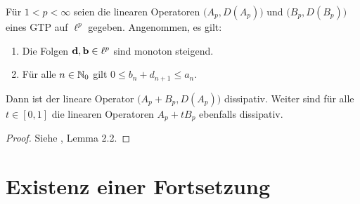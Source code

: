 \begin{lem}\label{Lemma zur Dissipativität}
Für $1<p<\infty$ seien die linearen Operatoren $\big(A_p, D(A_p)\big)$ und  $\big(B_p, D(B_p)\big)$ eines GTP auf $\ell^p$ gegeben. Angenommen, es gilt:
\begin{enumerate}
\item Die Folgen $\textnormal{\textbf{d}}, \textnormal{\textbf{b}}\in \ell^p$ sind monoton steigend.
\item Für alle $n\in\mathbb{N}_0$ gilt $0\leq b_n+d_{n+1}\leq a_n$.
\end{enumerate}
Dann ist der lineare Operator $\big(A_p+B_p, D(A_p)\big)$ dissipativ. Weiter sind für alle $t\in[0,1]$ die linearen Operatoren $A_p+tB_p$ ebenfalls dissipativ.
\end{lem}

\begin{proof}
Siehe \cite{banasiak_miroslaw_lachowicz_2006}, Lemma 2.2.
\end{proof}

\section{Existenz einer Fortsetzung}










